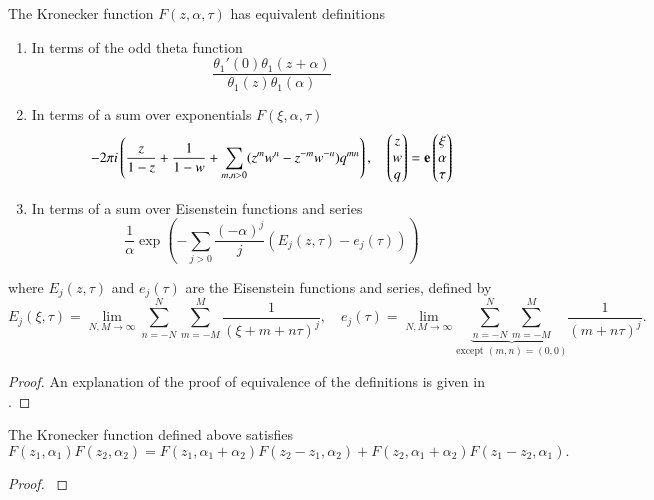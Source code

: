 \begin{definition}
    The Kronecker function $F(z,\alpha,\tau)$ has equivalent definitions \cite{BL13}
    \begin{enumerate}
        \item In terms of the odd theta function
        \[\frac{\theta_1'(0)\theta_1(z+\alpha)}{\theta_1(z)\theta_1(\alpha)}\]
        \item In terms of a sum over exponentials $F(\xi,\alpha,\tau)$
        \[-2\pi i \left(\frac{z}{1-z} + \frac{1}{1-w} + \sum_{m,n > 0} (z^m w^n - z^{-m} w^{-n}) q^{mn}\right) , \quad \begin{pmatrix} z \\ w \\ q \end{pmatrix} = \mathbf{e} \begin{pmatrix}\xi \\ \alpha \\ \tau\end{pmatrix}\]
        \item In terms of a sum over Eisenstein functions and series
        \[\frac{1}{\alpha} \exp\left(-\sum_{j > 0} \frac{(-\alpha)^j}{j} (E_j(z,\tau) - e_j(\tau))\right)\]
    \end{enumerate}
    where $E_j(z,\tau)$ and $e_j(\tau)$ are the Eisenstein functions and series, defined by
    \begin{equation}
        E_j(\xi,\tau) = \lim_{N,M\rightarrow \infty} \sum_{n=-N}^N \sum_{m=-M}^M \frac{1}{(\xi+m+n\tau)^j}, \quad e_j(\tau) = \lim_{N,M\rightarrow \infty} \underset{\text{except }(m,n)=(0,0)}{\underbrace{\sum_{n=-N}^N \sum_{m=-M}^M}} \frac{1}{(m+n\tau)^j}.
    \end{equation}
\end{definition}

\begin{proof}
    An explanation of the proof of equivalence of the definitions is given in \cite{BL13}. 
\end{proof}

\begin{lemma}
    The Kronecker function defined above satisfies
    \begin{equation}
        {F}(z_1,\alpha_1){F}(z_2,\alpha_2) = {F}(z_1,\alpha_1+\alpha_2){F}(z_2-z_1,\alpha_2) + {F}(z_2,\alpha_1+\alpha_2){F}(z_1-z_2,\alpha_1).
    \end{equation}
\end{lemma}

\begin{proof}
    \cite{Mat19}
\end{proof}

